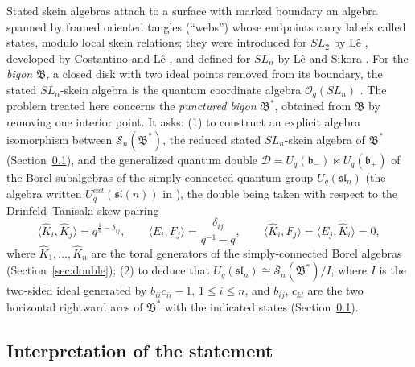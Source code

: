 \documentclass[12pt]{article}
\theoremstyle{remark}
\newcommand{\U}{U_q}
\newcommand{\slN}{\mathfrak{sl}_n}
\newcommand{\bp}{\mathfrak b_+}
\newcommand{\bm}{\mathfrak b_-}
\newcommand{\redS}{\overline{\mathcal S}_n}
\newcommand{\Bstar}{\mathfrak B^*}
\newcommand{\Bigon}{\mathfrak B}
\newcommand{\la}{\langle}
\newcommand{\ra}{\rangle}
\newcommand{\cD}{\mathcal D}
\newcommand{\Oq}{\mathcal O_q(SL_n)}
\begin{document}
Stated skein algebras attach to a surface with marked boundary an
algebra spanned by framed oriented tangles (``webs'') whose endpoints
carry labels called states, modulo local skein relations; they were
introduced for $SL_2$ by L\^e \cite{Le}, developed by Costantino and
L\^e \cite{CL}, and defined for $SL_n$ by L\^e and Sikora \cite{LS}. For the \emph{bigon} $\Bigon$, a closed disk
with two ideal points removed from its boundary, the stated
$SL_n$-skein algebra is the quantum coordinate algebra $\Oq$
\cite[Theorem 6.3]{LS}. The problem treated here concerns the
\emph{punctured bigon} $\Bstar$, obtained from $\Bigon$ by removing one
interior point. It asks:
(1) to construct an explicit algebra isomorphism between
$\redS(\Bstar)$, the reduced stated $SL_n$-skein algebra of $\Bstar$
(Section~\ref{sec:interp}), and the generalized quantum double $\cD=\U(\bm)\bowtie\U(\bp)$ of the
Borel subalgebras of the simply-connected quantum group $\U(\slN)$
(the algebra written $U^{ext}_q(\mathfrak{sl}(n))$ in
\cite[Section 8.5.3]{KS}), the double being taken with respect to the
Drinfeld--Tanisaki skew pairing
\begin{equation}\label{eq:problempairing}
 \la\hat K_i,\hat K_j\ra=q^{\frac1n-\delta_{ij}},\qquad
 \la E_i,F_j\ra=\frac{\delta_{ij}}{q^{-1}-q},\qquad
 \la\hat K_i,F_j\ra=\la E_j,\hat K_i\ra=0 ,
\end{equation}
where $\hat K_1,\dots,\hat K_n$ are the toral generators of the
simply-connected Borel algebras (Section~\ref{sec:double});
(2) to deduce that $\U(\slN)\cong\redS(\Bstar)/I$, where $I$ is
the two-sided ideal generated by $b_{ii}c_{ii}-1$, $1\le i\le n$, and
$b_{ij}$, $c_{kl}$ are the two horizontal rightward arcs of $\Bstar$
with the indicated states (Section~\ref{sec:interp}).

\subsection{Interpretation of the statement}\label{sec:interp}
\end{document}
